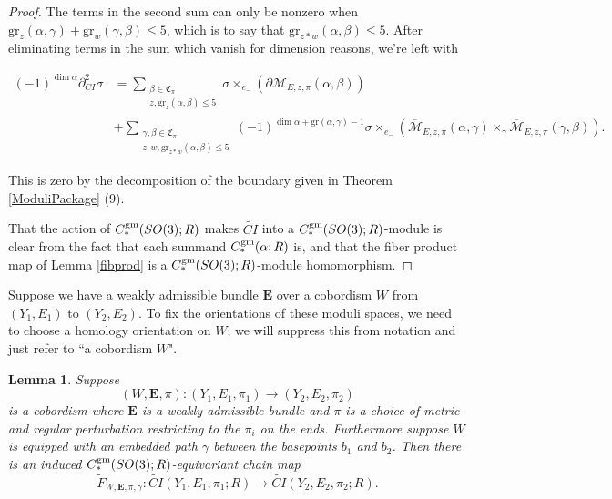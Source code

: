 \documentclass[10pt,a4paper]{amsart}
\newtheorem{lemma}[theorem]{Lemma}
\theoremstyle{definition}
\theoremstyle{remark}
\numberwithin{figure}{qchap}
\begin{document}
\begin{proof}
The terms in the second sum can only be nonzero when $\text{gr}_z(\alpha, \gamma) + \text{gr}_w(\gamma, \beta) \leq 5$, which is to say that $\text{gr}_{z \ast w}(\alpha, \beta) \leq 5$. After eliminating terms in the sum which vanish for dimension reasons, we're left with 

\begin{align*}(-1)^{\dim \alpha}\partial_{CI}^2 \sigma &= \sum_{\substack{\beta \in \mathfrak C_\pi\\z, \text{gr}_z(\alpha, \beta) \leq 5}}\sigma \times_{e_-} \left(\partial \overline{\mathcal M}_{E,z,\pi}(\alpha, \beta)\right) \\ 
&+ \sum_{\substack{\gamma, \beta \in \mathfrak C_\pi\\z, w, \text{gr}_{z \ast w}(\alpha,\beta) \leq 5}} (-1)^{\dim \alpha + \text{gr}(\alpha, \gamma) - 1} \sigma \times_{e_-} \left(\overline{\mathcal M}_{E,z,\pi}(\alpha, \gamma) \times_{\gamma} \overline{\mathcal M}_{E,z,\pi}(\gamma, \beta)\right).\end{align*}

This is zero by the decomposition of the boundary given in Theorem \ref{ModuliPackage} (9).

That the action of $C_*^{\textup{gm}}(SO(3);R)$ makes $\widetilde{CI}$ into a $C_*^{\textup{gm}}(SO(3);R)$-module is clear from the fact that each summand $C_*^{\textup{gm}}(\alpha;R)$ is, and that the fiber product map of Lemma \ref{fibprod} is a $C_*^{\textup{gm}}(SO(3);R)$-module homomorphism.
\end{proof}

Suppose we have a weakly admissible bundle $\mathbf{E}$ over a cobordism $W$ from $(Y_1, E_1)$ to $(Y_2, E_2)$. To fix the orientations of these moduli spaces, we need to choose a homology orientation on $W$; we will suppress this from notation and just refer to ``a cobordism $W$".

\begin{lemma}\label{inducedmap}Suppose $$(W,\mathbf{E},\pi): (Y_1, E_1,\pi_1) \to (Y_2, E_2,\pi_2)$$ is a cobordism where $\mathbf{E}$ is a weakly admissible bundle and $\pi$ is a choice of metric and regular perturbation restricting to the $\pi_i$ on the ends. Furthermore suppose $W$ is equipped with an embedded path $\gamma$ between the basepoints $b_1$ and $b_2$. Then there is an induced $C_*^{\textup{gm}}(SO(3);R)$-equivariant chain map $$\widetilde F_{W,\mathbf{E},\pi,\gamma}: \widetilde{CI}(Y_1, E_1, \pi_1;R) \to \widetilde{CI}(Y_2, E_2, \pi_2; R).$$ 
\end{lemma}
\end{document}
